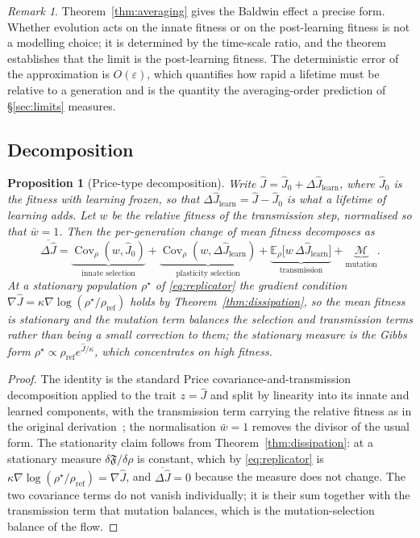 \documentclass[11pt]{article}
\newtheorem{proposition}[theorem]{Proposition}
\theoremstyle{definition}
\theoremstyle{remark}
\newtheorem{remark}[theorem]{Remark}
\DeclareMathOperator{\Cov}{Cov}
\newcommand{\E}{\mathbb{E}}
\newcommand{\cF}{\mathfrak{F}}
\begin{document}
\begin{remark}
Theorem~\ref{thm:averaging} gives the Baldwin effect a precise form. Whether evolution acts on the
innate fitness or on the post-learning fitness is not a modelling choice; it is determined by the
time-scale ratio, and the theorem establishes that the limit is the post-learning fitness. The
deterministic error of the approximation is $O(\varepsilon)$, which quantifies
how rapid a lifetime must be relative to a generation and is the quantity the averaging-order prediction
of \S\ref{sec:limits} measures.
\end{remark}

\subsection{Decomposition}
\begin{proposition}[Price-type decomposition]
\label{prop:price}
Write $\hat J=\hat J_0+\Delta\hat J_{\text{learn}}$, where $\hat J_0$ is the fitness with learning
frozen, so that $\Delta\hat J_{\text{learn}}=\hat J-\hat J_0$ is what a lifetime of learning adds. Let
$w$ be the relative fitness of the transmission step, normalised so that $\bar w=1$. Then the
per-generation change of mean fitness decomposes as
\begin{equation}
\overline{\Delta\hat J}=
\underbrace{\Cov_\rho(w,\hat J_0)}_{\text{innate selection}}
+\underbrace{\Cov_\rho(w,\Delta\hat J_{\text{learn}})}_{\text{plasticity selection}}
+\underbrace{\E_\rho\big[w\,\Delta\hat J_{\text{learn}}\big]}_{\text{transmission}}
+\underbrace{\mathcal{M}}_{\text{mutation}} .
\label{eq:price}
\end{equation}
At a stationary population $\rho^\star$ of \eqref{eq:replicator} the gradient condition
$\nabla\hat J=\kappa\nabla\log(\rho^\star/\rho_{\text{ref}})$ holds by
Theorem~\ref{thm:dissipation}, so the mean fitness is stationary and the mutation term balances the
selection and transmission terms rather than being a small correction to them; the stationary measure
is the Gibbs form $\rho^\star\propto\rho_{\text{ref}}e^{\hat J/\kappa}$, which concentrates on high
fitness.
\end{proposition}
\begin{proof}
\begin{sloppypar}
The identity is the standard Price covariance-and-transmission decomposition applied to the trait
$z=\hat J$ and split by linearity into its innate and learned components, with the transmission term
carrying the relative fitness as in the original derivation~\cite{price,frank}; the normalisation
$\bar w=1$ removes the divisor of the usual form. The stationarity claim follows from
Theorem~\ref{thm:dissipation}: at a stationary measure $\delta\cF/\delta\rho$ is constant, which by
\eqref{eq:replicator} is $\kappa\nabla\log(\rho^\star/\rho_{\text{ref}})=\nabla\hat J$, and
$\overline{\Delta\hat J}=0$ because the measure does not change. The two covariance terms do not vanish
individually; it is their sum together with the transmission term that mutation balances, which is the
mutation-selection balance of the flow.
\end{sloppypar}
\end{proof}
\end{document}

